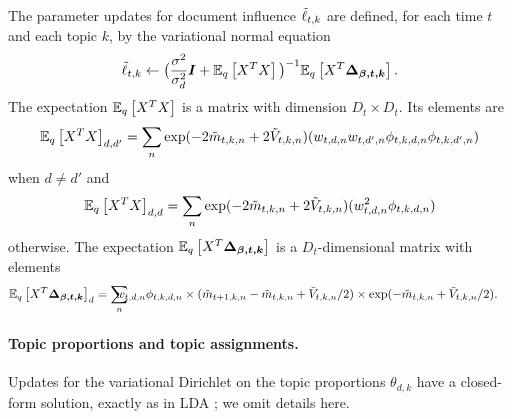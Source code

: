 The parameter updates for document influence $\tilde{\ell}_{t,k}$ are
defined, for each time $t$ and each topic $k$, by the
variational normal equation
\begin{align}
\tilde{\ell}_{t, k} \gets \big(  \frac{\sigma^2}{\sigma^2_{d}} \bm I
  + \mathbb{E}_q\left[X^T X\right] \big)^{-1} \mathbb{E}_q\left[X^T \bm{\Delta_{\beta,t,k}}\right].
  \label{eq:regression}
\end{align}
The expectation $\mathbb{E}_q\left[X^TX\right]$ is a matrix with dimension $D_t \times D_t$.  Its elements are
\begin{eqnarray*}
 {\mathbb{E}_q\left[X^T X\right]}_{d,d'} = \sum_n \exp(-2\tilde{m}_{t,k,n} + 2 \tilde{V}_{t,k,n}) (w_{t,d,n} w_{t,d',n} \phi_{t,k,d,n } \phi_{t,k,d',n})
\end{eqnarray*}
when $d \neq d'$ and
\begin{eqnarray*}
{\mathbb{E}_q\left[X^T X\right]}_{d,d} = \sum_n \exp(-2\tilde{m}_{t,k,n} + 2 \tilde{V}_{t,k,n}) (w_{t,d,n}^2 \phi_{t,k,d,n})
\end{eqnarray*}
otherwise. The expectation $\mathbb{E}_q\left[X^T \bm{\Delta_{\beta,t,k}}\right]$
is a $D_t$-dimensional matrix with elements
\begin{eqnarray*}
 {\expectq{X^T \bm{\Delta_{\beta,t,k}}}}_d = 
 \sum_n & \hspace{-10pt} w_{t,d,n} \phi_{t,k,d,n} 
  \times (\mv_{t+1,k,n} - \mv_{t,k,n} + \vv_{t,k,n}/2) 
  \times \exp(-\mv_{t,k,n} + \vv_{t,k,n}/2). 
\end{eqnarray*}

\paragraph{Topic proportions and topic assignments.}
Updates for the variational Dirichlet on the topic proportions
$\theta_{d,k}$ have a closed-form solution, exactly as in LDA
\cite{blei:2003}; we omit details here.

